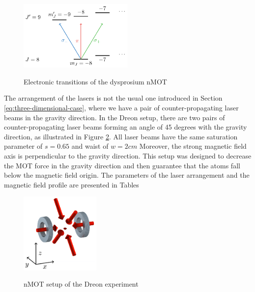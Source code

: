 \begin{figure}[!ht]
    \centering
    \caption{Electronic transitions of the dysprosium nMOT}
    \includegraphics[width=0.5\textwidth]{USPSC-img/Dy-Dreon-transitions.png}
    \vspace{5px}
    \label{fig:Dy-Dreon-electronic-transitions}
\end{figure}

The arrangement of the lasers is not the usual one introduced in Section \ref{eq:three-dimensional-case}, where we have a pair of counter-propagating laser beams in the gravity direction. In the Dreon setup, there are two pairs of counter-propagating laser beams forming an angle of 45 degrees with the gravity direction, as illustrated in Figure \ref{fig:Dreon-setup}. All laser beams have the same saturation parameter of $ s = 0.65 $ and waist of $ w = 2cm $ Moreover, the strong magnetic field axis is perpendicular to the gravity direction. This setup was designed to decrease the MOT force in the gravity direction and then guarantee that the atoms fall below the magnetic field origin. The parameters of the laser arrangement and the magnetic field profile are presented in Tables

\begin{figure}[!ht]
    \centering
    \caption{nMOT setup of the Dreon experiment}
    \includegraphics[width=0.35\textwidth]{USPSC-img/Dreon-setup.png}
    \label{fig:Dreon-setup}
    \vspace{-5px}
\end{figure}

